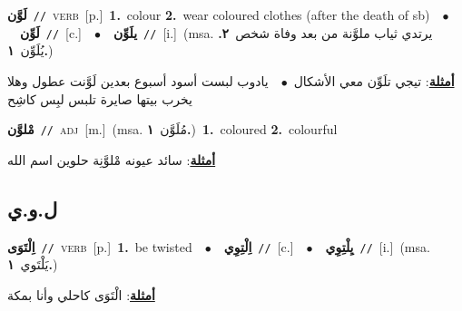 \documentclass[10pt,a4paper,twoside]{article} %
\begin{document}
\begin{multicols}{2}
{\setlength\topsep{0pt}\textbf{\foreignlanguage{arabic}{لَوَّن}}\ {\color{gray}\texttt{//}\color{black}}\ \textsc{verb}\ [p.]\ \textbf{1.}~colour  \textbf{2.}~wear coloured clothes (after the death of sb)\ \ $\bullet$\ \ \setlength\topsep{0pt}\textbf{\foreignlanguage{arabic}{لَوِّن}}\ {\color{gray}\texttt{//}\color{black}}\ [c.]\ \ $\bullet$\ \ \setlength\topsep{0pt}\textbf{\foreignlanguage{arabic}{يلَوِّن}}\ {\color{gray}\texttt{//}\color{black}}\ [i.]\ \color{gray}(msa. \foreignlanguage{arabic}{يرتدي ثياب ملوَّنة من بعد وفاة شخص}~\foreignlanguage{arabic}{\textbf{٢.}}  \foreignlanguage{arabic}{يُلَوِّن}~\foreignlanguage{arabic}{\textbf{١.}})\color{black}\  \begin{flushright}\color{gray}\foreignlanguage{arabic}{\textbf{\underline{\foreignlanguage{arabic}{أمثلة}}}: تيجي تلَوِّن معي الأشكال\ $\bullet$\ \  يادوب لبست أسود أسبوع بعدين لَوَّنت عطول وهلا يخرب بيتها صايرة تلبس لبِس كاشِح}\end{flushright}\color{black}} \vspace{2mm}

{\setlength\topsep{0pt}\textbf{\foreignlanguage{arabic}{مْلوَّن}}\ {\color{gray}\texttt{//}\color{black}}\ \textsc{adj}\ [m.]\ \color{gray}(msa. \foreignlanguage{arabic}{مُلَوَّن}~\foreignlanguage{arabic}{\textbf{١.}})\color{black}\ \textbf{1.}~coloured  \textbf{2.}~colourful\  \begin{flushright}\color{gray}\foreignlanguage{arabic}{\textbf{\underline{\foreignlanguage{arabic}{أمثلة}}}: سائد عيونه مْلوَّنِة حلوين اسم الله}\end{flushright}\color{black}} \vspace{2mm}

\vspace{-3mm}
\subsection*{\color{blue}\foreignlanguage{arabic}{ل.و.ي}\color{blue}{}} 

{\setlength\topsep{0pt}\textbf{\foreignlanguage{arabic}{اِلْتَوَى}}\ {\color{gray}\texttt{//}\color{black}}\ \textsc{verb}\ [p.]\ \textbf{1.}~be twisted\ \ $\bullet$\ \ \setlength\topsep{0pt}\textbf{\foreignlanguage{arabic}{اِلْتِوِي}}\ {\color{gray}\texttt{//}\color{black}}\ [c.]\ \ $\bullet$\ \ \setlength\topsep{0pt}\textbf{\foreignlanguage{arabic}{يِلْتِوِي}}\ {\color{gray}\texttt{//}\color{black}}\ [i.]\ \color{gray}(msa. \foreignlanguage{arabic}{يَلْتَوي}~\foreignlanguage{arabic}{\textbf{١.}})\color{black}\  \begin{flushright}\color{gray}\foreignlanguage{arabic}{\textbf{\underline{\foreignlanguage{arabic}{أمثلة}}}: الْتَوَى كاحلي وأنا بمكة}\end{flushright}\color{black}} \vspace{2mm}


\end{multicols}
\end{document}
